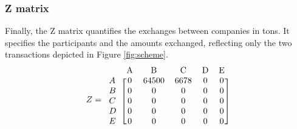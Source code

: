  \subsubsection{Z matrix}
 Finally, the Z matrix quantifies the exchanges between companies in tons. It specifies the participants and the amounts exchanged, reflecting only the two transactions depicted in Figure \ref{fig:scheme}.
 \begin{equation}
    \label{eq:matrice_z}
    Z = 
        \begin{blockarray}{cccccc}
         & \text{A} & \text{B} & \text{C} & \text{D} & \text{E} \\
        \begin{block}{l[ccccc]}
    A  & 0    & 64500 & 6678 & 0  & 0 \\
    B  & 0    & 0      & 0     & 0  & 0 \\
    C  & 0    & 0      & 0     & 0  & 0 \\
    D  & 0    & 0      & 0     & 0  & 0 \\
    E  & 0    & 0      & 0     & 0  & 0 \\
         \end{block}
         \end{blockarray}
\end{equation}